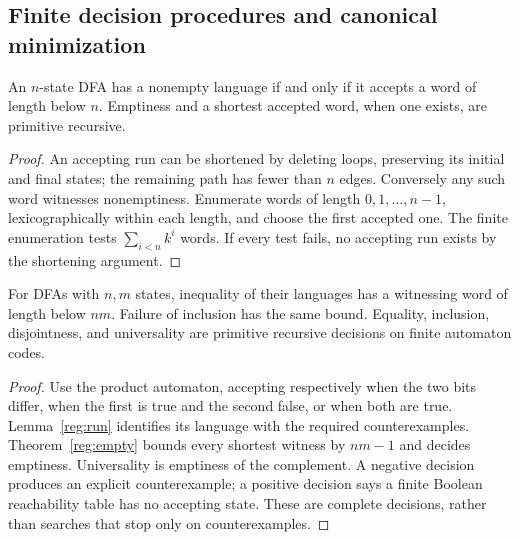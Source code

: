 \subsection{Finite decision procedures and canonical minimization}

\begin{theorem}\label{reg:empty}
An $n$-state DFA has a nonempty language if and only if it accepts a word
of length below $n$.  Emptiness and a shortest accepted word, when one
exists, are primitive recursive.
\end{theorem}
\begin{proof}
An accepting run can be shortened by deleting loops, preserving its
initial and final states; the remaining path has fewer than $n$ edges.
Conversely any such word witnesses nonemptiness.  Enumerate words of
length $0,1,\ldots,n-1$, lexicographically within each length, and choose
the first accepted one.  The finite enumeration tests
$\sum_{i<n}k^i$ words.  If every test fails, no accepting run exists by
the shortening argument.
\end{proof}

\begin{theorem}
\label{reg:equality}
For DFAs with $n,m$ states, inequality of their languages has a witnessing
word of length below $nm$.  Failure of inclusion has the same bound.
Equality, inclusion, disjointness, and universality are primitive
recursive decisions on finite automaton codes.
\end{theorem}
\begin{proof}
Use the product automaton, accepting respectively when the two bits
differ, when the first is true and the second false, or when both are
true.  Lemma~\ref{reg:run} identifies its language with the required
counterexamples.  Theorem~\ref{reg:empty} bounds every shortest witness
by $nm-1$ and decides emptiness.  Universality is emptiness of the
complement.  A negative decision produces an explicit counterexample;
a positive decision says a finite Boolean reachability table has no
accepting state.  These are complete decisions, rather than searches
that stop only on counterexamples.
\end{proof}

